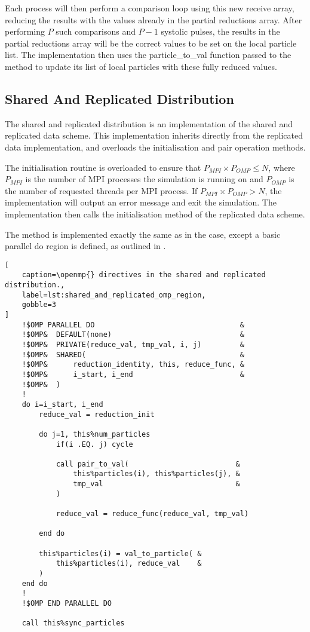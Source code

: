 Each process will then perform a comparison loop using this new receive
array, reducing the results with the values already in the partial
reductions array.
%
After performing $P$ such comparisons and $P-1$ systolic pulses,
the results in the partial reductions array will be the correct
values to be set on the local particle list.
%
The implementation then uses the particle\_to\_val function
passed to the method to update
its list of local particles with these fully reduced values.


\subsection{Shared And Replicated Distribution}

%
The shared and replicated distribution is an implementation of the
shared and replicated data scheme.
%
This implementation inherits directly from the replicated data
implementation, and overloads the initialisation and pair operation
methods.

The initialisation routine is overloaded to ensure that
$P_{MPI}\times{}P_{OMP} \le{} N$, where $P_{MPI}$ is the number of MPI
processes the simulation is running on and $P_{OMP}$ is the
number of requested \openmp{} threads per MPI process.
%
If $P_{MPI}\times{}P_{OMP} > N$, the implementation will output an error message
and exit the simulation.
%
The implementation then calls the initialisation method of the
replicated data scheme.

The \pairoperation{} method is implemented exactly the same
as in the \replicateddata{} case, except a basic \openmp{}
parallel do region is defined, as outlined in
.

\begin{lstlisting}[
    caption=\openmp{} directives in the shared and replicated distribution.,
    label=lst:shared_and_replicated_omp_region,
    gobble=3
]
    !$OMP PARALLEL DO                                  &
    !$OMP&  DEFAULT(none)                              &
    !$OMP&  PRIVATE(reduce_val, tmp_val, i, j)         &
    !$OMP&  SHARED(                                    &
    !$OMP&      reduction_identity, this, reduce_func, &
    !$OMP&      i_start, i_end                         &
    !$OMP&  )
    !
    do i=i_start, i_end
        reduce_val = reduction_init

        do j=1, this%num_particles
            if(i .EQ. j) cycle

            call pair_to_val(                         &
                this%particles(i), this%particles(j), &
                tmp_val                               &
            )

            reduce_val = reduce_func(reduce_val, tmp_val)

        end do

        this%particles(i) = val_to_particle( &
            this%particles(i), reduce_val    &
        )
    end do
    !
    !$OMP END PARALLEL DO

    call this%sync_particles
\end{lstlisting}


